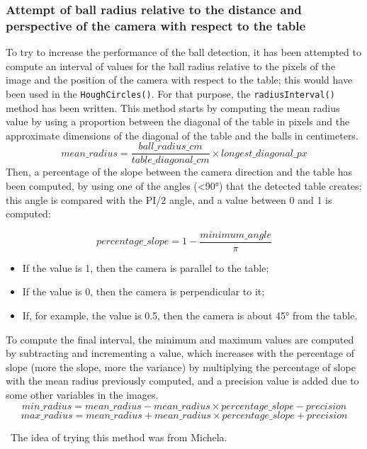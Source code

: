 \subsubsection{Attempt of ball radius relative to the distance and perspective of the camera with respect to the table}

To try to increase the performance of the ball detection, it has been attempted to compute an interval of values for the ball radius relative to the pixels of the image and the position of the camera with respect to the table; this would have been used in the \texttt{HoughCircles()}. For that purpose, the \texttt{radiusInterval()} method has been written. This method starts by computing the mean radius value by using a proportion between the diagonal of the table in pixels and the approximate dimensions of the diagonal of the table and the balls in centimeters. 
\begin{equation}
	mean\_radius =  \frac{ball\_radius\_cm}{table\_diagonal\_cm} \times longest\_diagonal\_px
\end{equation}
Then, a percentage of the slope between the camera direction and the table has been computed, by using one of the angles (<90°) that the detected table creates; this angle is compared with the PI/2 angle, and a value between 0 and 1 is computed:

\begin{equation}
	percentage\_slope = 1 - \frac{minimum\_angle}{\pi}
\end{equation}

\begin{itemize}
	\item If the value is 1, then the camera is parallel to the table;
	\item If the value is 0, then the camera is perpendicular to it;
	\item If, for example, the value is 0.5, then the camera is about 45° from the table.
\end{itemize}
	
To compute the final interval, the minimum and maximum values are computed by subtracting and incrementing a value, which increases with the percentage of slope (more the slope, more the variance) by multiplying the percentage of slope with the mean radius previously computed, and a precision value is added due to some other variables in the images.
\begin{equation}
	min\_radius = mean\_radius - mean\_radius \times percentage\_slope - precision
\end{equation}
\begin{equation}
	max\_radius = mean\_radius + mean\_radius \times percentage\_slope + precision
\end{equation}

\
The idea of trying this method was from Michela.

